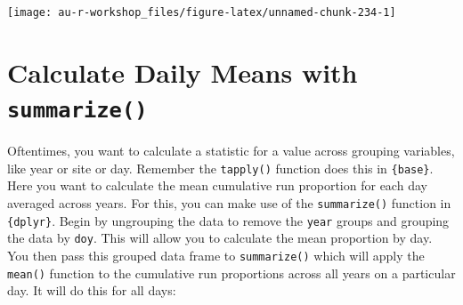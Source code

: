 \documentclass[]{book}
\newenvironment{Shaded}{\begin{snugshade}}{\end{snugshade}}
\newcommand{\KeywordTok}[1]{\textcolor[rgb]{0.13,0.29,0.53}{\textbf{#1}}}
\newcommand{\DataTypeTok}[1]{\textcolor[rgb]{0.13,0.29,0.53}{#1}}
\newcommand{\DecValTok}[1]{\textcolor[rgb]{0.00,0.00,0.81}{#1}}
\newcommand{\StringTok}[1]{\textcolor[rgb]{0.31,0.60,0.02}{#1}}
\newcommand{\CommentTok}[1]{\textcolor[rgb]{0.56,0.35,0.01}{\textit{#1}}}
\newcommand{\ControlFlowTok}[1]{\textcolor[rgb]{0.13,0.29,0.53}{\textbf{#1}}}
\newcommand{\OperatorTok}[1]{\textcolor[rgb]{0.81,0.36,0.00}{\textbf{#1}}}
\newcommand{\NormalTok}[1]{#1}
\theoremstyle{definition}
\theoremstyle{definition}
\theoremstyle{definition}
\theoremstyle{remark}
\begin{document}
\begin{Shaded}
\end{Shaded}

\begin{center}\texttt{[image: au-r-workshop\_files/figure-latex/unnamed-chunk-234-1]} \end{center}

\section{\texorpdfstring{Calculate Daily Means with
\texttt{summarize()}}{Calculate Daily Means with summarize()}}\label{calculate-daily-means-with-summarize}

Oftentimes, you want to calculate a statistic for a value across
grouping variables, like year or site or day. Remember the
\texttt{tapply()} function does this in \texttt{\{base\}}. Here you want
to calculate the mean cumulative run proportion for each day averaged
across years. For this, you can make use of the \texttt{summarize()}
function in \texttt{\{dplyr\}}. Begin by ungrouping the data to remove
the \texttt{year} groups and grouping the data by \texttt{doy}. This
will allow you to calculate the mean proportion by day. You then pass
this grouped data frame to \texttt{summarize()} which will apply the
\texttt{mean()} function to the cumulative run proportions across all
years on a particular day. It will do this for all days:
\end{document}
